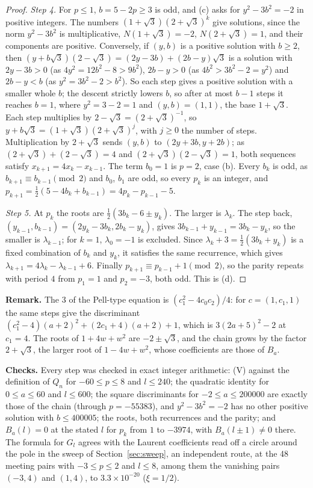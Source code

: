 \documentclass[11pt]{article}
\begin{document}
\begin{proof}
\emph{Step 4.} For $p\le1$, $b=5-2p\ge3$ is odd, and (c) asks for $y^2-3b^2=-2$ in positive integers. The numbers $(1+\sqrt3)(2+\sqrt3)^k$ give solutions, since the norm $y^2-3b^2$ is multiplicative, $N(1+\sqrt3)=-2$, $N(2+\sqrt3)=1$, and their components are positive. Conversely, if $(y,b)$ is a positive solution with $b\ge2$, then $(y+b\sqrt3)(2-\sqrt3)=(2y-3b)+(2b-y)\sqrt3$ is a solution with $2y-3b>0$ (as $4y^2=12b^2-8>9b^2$), $2b-y>0$ (as $4b^2>3b^2-2=y^2$) and $2b-y<b$ (as $y^2=3b^2-2>b^2$). So each step gives a positive solution with a smaller whole $b$; the descent strictly lowers $b$, so after at most $b-1$ steps it reaches $b=1$, where $y^2=3-2=1$ and $(y,b)=(1,1)$, the base $1+\sqrt3$. Each step multiplies by $2-\sqrt3=(2+\sqrt3)^{-1}$, so $y+b\sqrt3=(1+\sqrt3)(2+\sqrt3)^j$, with $j\ge0$ the number of steps. Multiplication by $2+\sqrt3$ sends $(y,b)$ to $(2y+3b,y+2b)$; as $(2+\sqrt3)+(2-\sqrt3)=4$ and $(2+\sqrt3)(2-\sqrt3)=1$, both sequences satisfy $x_{k+1}=4x_k-x_{k-1}$. The term $b_0=1$ is $p=2$, case (b). Every $b_k$ is odd, as $b_{k+1}\equiv b_{k-1}\pmod2$ and $b_0$, $b_1$ are odd, so every $p_k$ is an integer, and $p_{k+1}=\frac12(5-4b_k+b_{k-1})=4p_k-p_{k-1}-5$.

\emph{Step 5.} At $p_k$ the roots are $\frac12(3b_k-6\pm y_k)$. The larger is $\lambda_k$. The step back, $(y_{k-1},b_{k-1})=(2y_k-3b_k,2b_k-y_k)$, gives $3b_{k-1}+y_{k-1}=3b_k-y_k$, so the smaller is $\lambda_{k-1}$; for $k=1$, $\lambda_0=-1$ is excluded. Since $\lambda_k+3=\frac12(3b_k+y_k)$ is a fixed combination of $b_k$ and $y_k$, it satisfies the same recurrence, which gives $\lambda_{k+1}=4\lambda_k-\lambda_{k-1}+6$. Finally $p_{k+1}\equiv p_{k-1}+1\pmod2$, so the parity repeats with period $4$ from $p_1=1$ and $p_2=-3$, both odd. This is (d).
\end{proof}

\noindent\textbf{Remark.} The $3$ of the Pell-type equation is $(c_1^2-4c_0c_2)/4$: for $c=(1,c_1,1)$ the same steps give the discriminant $(c_1^2-4)(a+2)^2+(2c_1+4)(a+2)+1$, which is $3(2a+5)^2-2$ at $c_1=4$. The roots of $1+4w+w^2$ are $-2\pm\sqrt3$, and the chain grows by the factor $2+\sqrt3$, the larger root of $1-4w+w^2$, whose coefficients are those of $B_a$.

\noindent\textbf{Checks.} Every step was checked in exact integer arithmetic: (V) against the definition of $Q_n$ for $-60\le p\le8$ and $l\le240$; the quadratic identity for $0\le a\le60$ and $l\le600$; the square discriminants for $-2\le a\le200000$ are exactly those of the chain (through $p=-55383$), and $y^2-3b^2=-2$ has no other positive solution with $b\le400005$; the roots, both recurrences and the parity; and $B_a(l)=0$ at the stated $l$ for $p_k$ from $1$ to $-3974$, with $B_a(l\pm1)\ne0$ there. The formula for $G_l$ agrees with the Laurent coefficients read off a circle around the pole in the sweep of Section~\ref{sec:sweep}, an independent route, at the 48 meeting pairs with $-3\le p\le2$ and $l\le8$, among them the vanishing pairs $(-3,4)$ and $(1,4)$, to $3.3\times10^{-20}$ ($\xi=1/2$).
\end{document}
